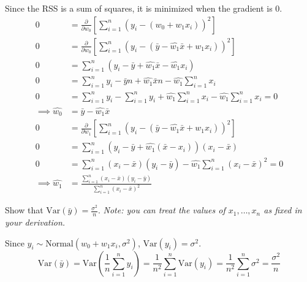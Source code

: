 \documentclass{article}
\newcommand{\V}{\text{Var}}
\begin{document}
\begin{probset}
\begin{prob}
\begin{subprobset}
\begin{subprob}
        \begin{soln}
            Since the RSS is a sum of squares, it is minimized when the gradient is 0.
            \begin{align*}
                0 &= \frac{\partial}{\partial w_0} \left[ \sum_{i=1}^n (y_i - (w_0 + w_1 x_i))^2 \right] \\
                0 &= \frac{\partial}{\partial w_0} \left[ \sum_{i=1}^n (y_i - (\bar{y} - \hat{w_1} \bar{x} + w_1 x_i))^2 \right] \\
                0 &= \sum_{i=1}^n (y_i - \bar{y} + \hat{w_1} \bar{x} - \hat{w_1} x_i) \\
                0 &= \sum_{i=1}^n y_i - \bar{y} n + \hat{w_1} \bar{x} n - \hat{w_1} \sum_{i=1}^n x_i \\
                0 &= \sum_{i=1}^n y_i - \sum_{i=1}^n y_i + \hat{w_1} \sum_{i=1}^n x_i - \hat{w_1} \sum_{i=1}^n x_i = 0 \\
                \implies \hat{w_0} &= \bar{y} - \hat{w_1} \bar{x} \\
                0 &= \frac{\partial}{\partial w_1} \left[ \sum_{i=1}^n (y_i - (\bar{y} - \hat{w_1} \bar{x} + w_1 x_i))^2 \right] \\
                0 &= \sum_{i=1}^n (y_i - \bar{y} + \hat{w_1} (\bar{x} - x_i)) (x_i - \bar{x}) \\
                0 &= \sum_{i=1}^n (x_i - \bar{x})(y_i - \bar{y}) - \hat{w_1} \sum_{i=1}^n (x_i - \bar{x})^2 = 0 \\
                \implies \hat{w_1} &= \frac{\sum_{i=1}^n (x_i - \bar{x})(y_i - \bar{y})}{\sum_{i=1}^n (x_i - \bar{x})^2}
            \end{align*}
        \end{soln}
    \end{subprob}

    \begin{subprob}
        Show that $\V ( \bar{y} ) = \frac{\sigma^2}{n}$. \textit{Note: you can treat the values of $x_1, \dots, x_n$ as fixed in your derivation.}

        \begin{soln}
            Since $y_i \sim \text{Normal}(w_0 + w_1x_i, \sigma^2)$, $\V(y_i) = \sigma^2$.
            \[ \V(\bar{y}) = \V\left(\frac{1}{n} \sum_{i=1}^n y_i\right) = \frac{1}{n^2} \sum_{i=1}^n \V(y_i) = \frac{1}{n^2} \sum_{i=1}^n \sigma^2 = \frac{\sigma^2}{n} \]
        \end{soln}
    \end{subprob}


\end{subprobset}
\end{prob}
\end{probset}
\end{document}
